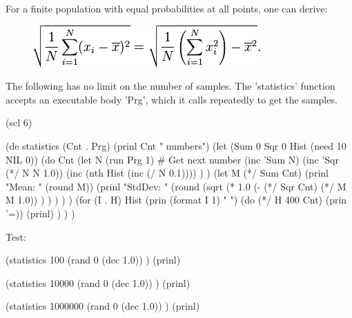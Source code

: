 For a finite population with equal probabilities at all points, one can
derive:

\begin{figure}[H]
\centering
\includegraphics[scale=.6]{graphics/1a6a1cf8fdc67e4bd31e60a052c3c9ae.png}
\end{figure}


\begin{wideverbatim}

The following has no limit on the number of samples. The 'statistics' function
accepts an executable body 'Prg', which it calls repeatedly to get the samples.

(scl 6)

(de statistics (Cnt . Prg)
   (prinl Cnt " numbers")
   (let (Sum 0  Sqr 0  Hist (need 10 NIL 0))
      (do Cnt
         (let N (run Prg 1)  # Get next number
            (inc 'Sum N)
            (inc 'Sqr (*/ N N 1.0))
            (inc (nth Hist (inc (/ N 0.1)))) ) )
      (let M (*/ Sum Cnt)
         (prinl "Mean:   " (round M))
         (prinl "StdDev: "
            (round
               (sqrt
                  (* 1.0
                     (- (*/ Sqr Cnt) (*/ M M 1.0)) ) ) ) ) )
      (for (I . H) Hist
         (prin (format I 1) " ")
         (do (*/ H 400 Cnt) (prin '=))
         (prinl) ) ) )

Test:

(statistics 100
   (rand 0 (dec 1.0)) )
(prinl)

(statistics 10000
   (rand 0 (dec 1.0)) )
(prinl)

(statistics 1000000
   (rand 0 (dec 1.0)) )
(prinl)


\end{wideverbatim}

